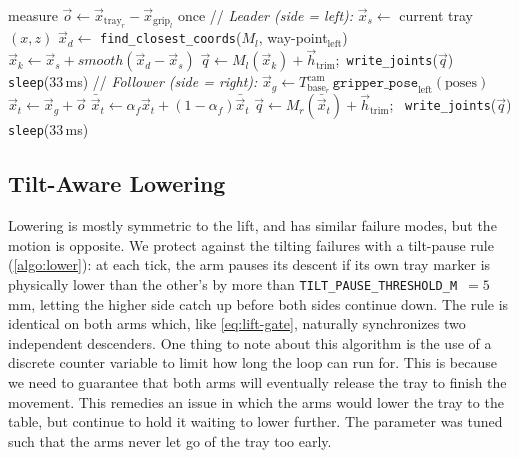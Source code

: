 \begin{algorithm} [h]
\caption{TRANSLATE: leader and follower}
\label{algo:translate}
\begin{algorithmic}[1]
   measure
         $\vec{o} \gets \vec{x}_{\text{tray}_r} -
          \vec{x}_{\text{grip}_l}$ once
  \STATE // \emph{Leader (side = left):}
  \STATE $\vec{x}_s \gets$ current tray $(x,z)$
  \STATE $\vec{x}_d \gets$ \texttt{find\_closest\_coords}($M_l$,
         way-point$_{\text{left}}$)
    \STATE $\vec{x}_k \gets \vec{x}_s + smooth(\vec{x}_d-\vec{x}_s)$
    \STATE $\vec{q} \gets M_l(\vec{x}_k) + \vec{h}_{\text{trim}}$;\
           \texttt{write\_joints}($\vec{q}$)
    \STATE \texttt{sleep}(33\,ms)
  \ENDFOR
  \STATE // \emph{Follower (side = right):}
    \STATE $\vec{x}_g \gets T_{\text{base}_r}^{\text{cam}}\,
           \texttt{gripper\_pose}_\text{left}(\text{poses})$
    \STATE $\vec{x}_t \gets \vec{x}_g + \vec{o}$
    \STATE $\bar{\vec{x}}_t \gets
           \alpha_f\vec{x}_t+(1\!-\!\alpha_f)\bar{\vec{x}}_t$
    \STATE $\vec{q} \gets M_r(\bar{\vec{x}}_t) + \vec{h}_{\text{trim}}$;
           \ \texttt{write\_joints}($\vec{q}$)
    \STATE \texttt{sleep}(33\,ms)
  \ENDFOR
\end{algorithmic}
\end{algorithm}

\subsection{Tilt-Aware Lowering}
\label{sec:lower}
Lowering is mostly symmetric to the lift, and has similar failure modes, but the motion is opposite. We protect against the tilting failures with a tilt-pause rule (\cref{algo:lower}): at each tick, the arm pauses its descent if
its own tray marker is physically lower than the other's by more
than \texttt{TILT\_PAUSE\_THRESHOLD\_M}~$=5$\,mm, letting the
higher side catch up before both sides continue down. The rule is identical on both arms which, like \eqref{eq:lift-gate}, naturally synchronizes two independent descenders. One thing to note about this algorithm is the use of a discrete counter variable to limit how long the loop can run for. This is because we need to guarantee that both arms will eventually release the tray to finish the movement. This remedies an issue
in which the arms would lower the tray to the table, but continue to hold it waiting to lower further. The parameter was tuned such that the arms never let go of the tray too early.

